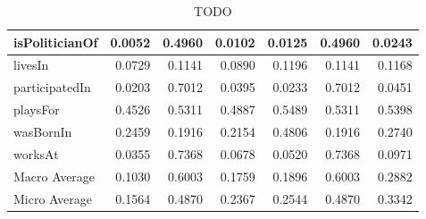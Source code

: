 \begin{table}[htbp]
\begin{tabular}{|l|r|r|r|r|r|r|}
 isPoliticianOf & 0.0052 & 0.4960 & 0.0102 & 0.0125 & 0.4960 & 0.0243 \\ \hline
 livesIn & 0.0729 & 0.1141 & 0.0890 & 0.1196 & 0.1141 & 0.1168 \\ \hline
 participatedIn & 0.0203 & 0.7012 & 0.0395 & 0.0233 & 0.7012 & 0.0451 \\ \hline
 playsFor & 0.4526 & 0.5311 & 0.4887 & 0.5489 & 0.5311 & 0.5398 \\ \hline
 wasBornIn & 0.2459 & 0.1916 & 0.2154 & 0.4806 & 0.1916 & 0.2740 \\ \hline
 worksAt & 0.0355 & 0.7368 & 0.0678 & 0.0520 & 0.7368 & 0.0971 \\ \hline
 Macro Average & 0.1030 & 0.6003 & 0.1759 & 0.1896 & 0.6003 & 0.2882 \\ \hline
 Micro Average & 0.1564 & 0.4870 & 0.2367 & 0.2544 & 0.4870 & 0.3342 \\ \hline
 \end{tabular}
\caption{TODO}
 \label{t:type}
 \end{table}

